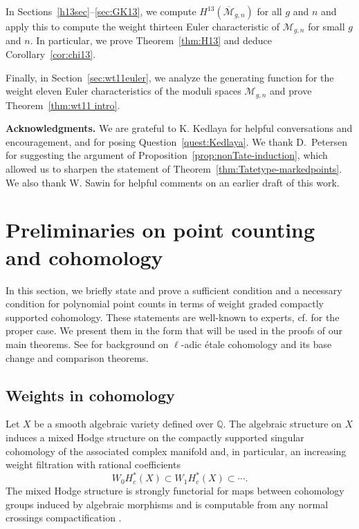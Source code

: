 \documentclass[12pt]{amsart}
\theoremstyle{definition}
\numberwithin{equation}{section}
\newcommand{\M}{\mathcal{M}}
\newcommand{\Q}{\mathbb{Q}}
\newcommand{\cM}{\mathcal{M}}
\newcommand{\Mb}{\overline{\M}}
\theoremstyle{definition} %
\theoremstyle{remark}
\begin{document}
In Sections~\ref{h13sec}--\ref{sec:GK13}, we compute $H^{13}(\Mb_{g,n})$ for all $g$ and $n$ and apply this to compute the weight thirteen Euler characteristic of $\M_{g,n}$ for small $g$ and $n$.  In particular, we prove  Theorem~\ref{thm:H13} and deduce Corollary~\ref{cor:chi13}. 

Finally, in Section~\ref{sec:wt11euler}, we analyze the generating function for the weight eleven Euler characteristics of the moduli spaces $\cM_{g,n}$ and prove Theorem~\ref{thm:wt11 intro}.

\medskip

\noindent \textbf{Acknowledgments.} We are grateful to K. Kedlaya for helpful conversations and encouragement, and for posing Question~\ref{quest:Kedlaya}. We thank D.~Petersen for suggesting the argument of Proposition~\ref{prop:nonTate-induction}, which allowed us to sharpen the statement of Theorem~\ref{thm:Tatetype-markedpoints}. We also thank W. Sawin for helpful comments on an earlier draft of this work.



\section{Preliminaries on point counting and cohomology}\label{pointcounting}

In this section, we briefly state and prove a sufficient condition and a necessary condition for polynomial point counts in terms of weight graded compactly supported cohomology. These statements are well-known to experts, cf. \cite{BogaartEdixhoven} for the proper case. We present them in the form that will be used in the proofs of our main theorems. See \cite{MilneLectures} for background on $\ell$-adic \'etale cohomology and its base change and comparison theorems.

\subsection{Weights in cohomology} Let $X$ be a smooth algebraic variety defined over $\Q$. The algebraic structure on $X$ induces a mixed Hodge structure on the compactly supported singular cohomology of the associated complex manifold and, in particular, an increasing weight filtration with rational coefficients
\[
W_0H^*_c(X) \subset W_1 H^*_c(X) \subset \cdots.
\] 
The mixed Hodge structure is strongly functorial for maps between cohomology groups induced by algebraic morphisms and is computable from any normal crossings compactification \cite{DeligneHodgeII, DeligneHodgeIII}.
\end{document}
